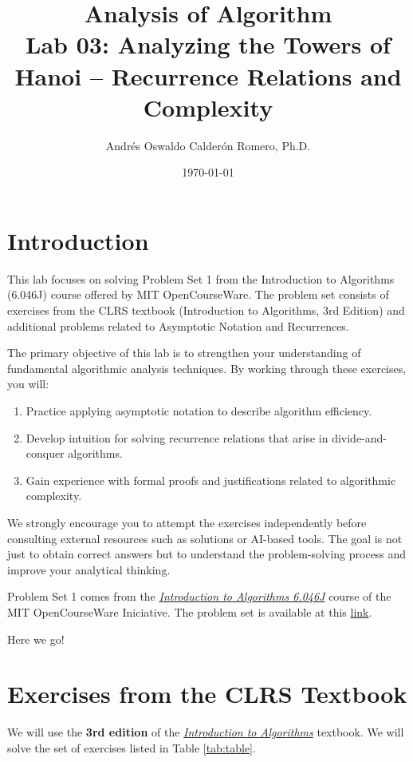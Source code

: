 \documentclass[12pt]{article}
\title{Analysis of Algorithm \\ Lab 03: Analyzing the Towers of Hanoi – Recurrence Relations and Complexity}
\author{Andrés Oswaldo Calderón Romero, Ph.D.}
\date{\today}
\begin{document}
\maketitle

\section{Introduction}
This lab focuses on solving Problem Set 1 from the Introduction to Algorithms (6.046J) course offered by MIT OpenCourseWare. The problem set consists of exercises from the CLRS textbook (Introduction to Algorithms, 3rd Edition) and additional problems related to Asymptotic Notation and Recurrences.

The primary objective of this lab is to strengthen your understanding of fundamental algorithmic analysis techniques. By working through these exercises, you will:

\begin{enumerate}
    \item Practice applying asymptotic notation to describe algorithm efficiency.
    \item Develop intuition for solving recurrence relations that arise in divide-and-conquer algorithms.
    \item Gain experience with formal proofs and justifications related to algorithmic complexity.
\end{enumerate}

We strongly encourage you to attempt the exercises independently before consulting external resources such as solutions or AI-based tools. The goal is not just to obtain correct answers but to understand the problem-solving process and improve your analytical thinking.

Problem Set 1 comes from the \href{https://ocw.mit.edu/courses/6-046j-introduction-to-algorithms-sma-5503-fall-2005/}{\textit{Introduction to Algorithms 6.046J}} course of the MIT OpenCourseWare Iniciative.  The problem set is available at this \href{https://ocw.mit.edu/courses/6-046j-introduction-to-algorithms-sma-5503-fall-2005/21bf373b58dcd53a7650a8072a76a448_ps1.pdf}{link}.

Here we go!

\section{Exercises from the CLRS Textbook}\label{sec:exercises}
We will use the \textbf{3rd edition} of the \href{https://mitpress.mit.edu/9780262533058/introduction-to-algorithms/}{\textit{Introduction to Algorithms}} textbook. We will solve the set of exercises listed in Table \ref{tab:table}.
\end{document}
